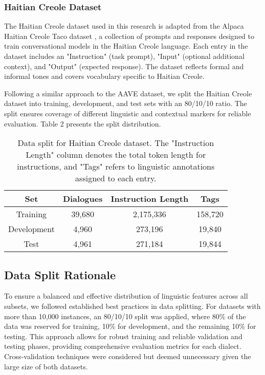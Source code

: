 \subsubsection{Haitian Creole Dataset}
The Haitian Creole dataset used in this research is adapted from the Alpaca Haitian Creole Taco dataset \cite{SAILLab:24}, a collection of prompts and responses designed to train conversational models in the Haitian Creole language. Each entry in the dataset includes an "Instruction" (task prompt), "Input" (optional additional context), and "Output" (expected response). The dataset reflects formal and informal tones and covers vocabulary specific to Haitian Creole.

Following a similar approach to the AAVE dataset, we split the Haitian Creole dataset into training, development, and test sets with an 80/10/10 ratio. The split ensures coverage of different linguistic and contextual markers for reliable evaluation. Table 2 presents the split distribution.

\begin{table}[h]
    \centering
    \small  %
    \setlength{\tabcolsep}{4pt} %
    \renewcommand{\arraystretch}{1.1} %
    \begin{tabular}{|c|c|c|c|}
    \hline
    \textbf{Set} & \textbf{Dialogues} & \textbf{Instruction Length} & \textbf{Tags} \\
    \hline
    Training & 39,680 & 2,175,336 & 158,720 \\
    Development & 4,960 & 273,196 & 19,840 \\
    Test & 4,961 & 271,184 & 19,844 \\
    \hline
    \end{tabular}
    \caption{Data split for Haitian Creole dataset. The "Instruction Length" column denotes the total token length for instructions, and "Tags" refers to linguistic annotations assigned to each entry.}
\end{table}

\subsection{Data Split Rationale}
To ensure a balanced and effective distribution of linguistic features across all subsets, we followed established best practices in data splitting. For datasets with more than 10,000 instances, an 80/10/10 split was applied, where 80\% of the data was reserved for training, 10\% for development, and the remaining 10\% for testing. This approach allows for robust training and reliable validation and testing phases, providing comprehensive evaluation metrics for each dialect. Cross-validation techniques were considered but deemed unnecessary given the large size of both datasets.


